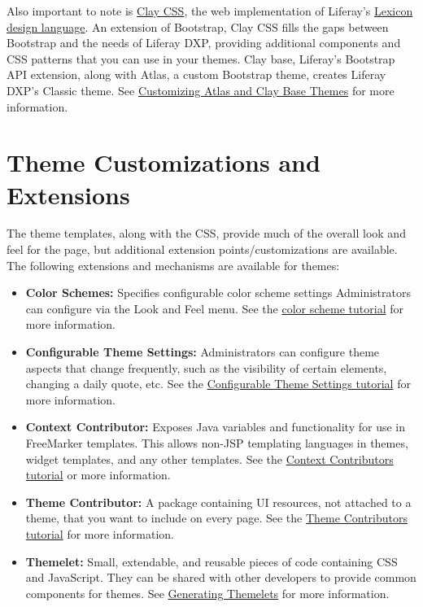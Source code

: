Also important to note is \href{https://clayui.com/}{Clay CSS}, the web
implementation of Liferay's \href{https://lexicondesign.io/}{Lexicon
design language}. An extension of Bootstrap, Clay CSS fills the gaps
between Bootstrap and the needs of Liferay DXP, providing additional
components and CSS patterns that you can use in your themes. Clay base,
Liferay's Bootstrap API extension, along with Atlas, a custom Bootstrap
theme, creates Liferay DXP's Classic theme. See
\href{/docs/7-2/frameworks/-/knowledge_base/f/customizing-atlas-and-clay-base-themes}{Customizing
Atlas and Clay Base Themes} for more information.

\section{Theme Customizations and
Extensions}\label{theme-customizations-and-extensions}

The theme templates, along with the CSS, provide much of the overall
look and feel for the page, but additional extension
points/customizations are available. The following extensions and
mechanisms are available for themes:

\begin{itemize}
\tightlist
\item
  \textbf{Color Schemes:} Specifies configurable color scheme settings
  Administrators can configure via the Look and Feel menu. See the
  \href{/docs/7-2/frameworks/-/knowledge_base/f/creating-color-schemes-for-your-theme}{color
  scheme tutorial} for more information.
\item
  \textbf{Configurable Theme Settings:} Administrators can configure
  theme aspects that change frequently, such as the visibility of
  certain elements, changing a daily quote, etc. See the
  \href{/docs/7-2/frameworks/-/knowledge_base/f/making-configurable-theme-settings}{Configurable
  Theme Settings tutorial} for more information.
\item
  \textbf{Context Contributor:} Exposes Java variables and functionality
  for use in FreeMarker templates. This allows non-JSP templating
  languages in themes, widget templates, and any other templates. See
  the
  \href{/docs/7-2/frameworks/-/knowledge_base/f/injecting-additional-context-variables-and-functionality-into-your-theme-templates}{Context
  Contributors tutorial} or more information.
\item
  \textbf{Theme Contributor:} A package containing UI resources, not
  attached to a theme, that you want to include on every page. See the
  \href{/docs/7-2/frameworks/-/knowledge_base/f/packaging-independent-ui-resources-for-your-site}{Theme
  Contributors tutorial} for more information.
\item
  \textbf{Themelet:} Small, extendable, and reusable pieces of code
  containing CSS and JavaScript. They can be shared with other
  developers to provide common components for themes. See
  \href{/docs/7-2/reference/-/knowledge_base/r/creating-themelets-with-the-themes-generator}{Generating
  Themelets} for more information.
\end{itemize}

